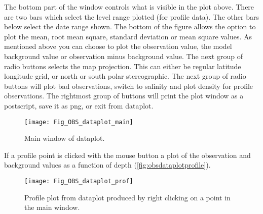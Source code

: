 \documentclass[../main/NEMO_manual]{subfiles}
\begin{document}
The bottom part of the window controls what is visible in the plot above.
There are two bars which select the level range plotted (for profile data).
The other bars below select the date range shown.
The bottom of the figure allows the option to plot the mean, root mean square, standard deviation or
mean square values.
As mentioned above you can choose to plot the observation value, the model background value or
observation minus background value.
The next group of radio buttons selects the map projection.
This can either be regular latitude longitude grid, or north or south polar stereographic.
The next group of radio buttons will plot bad observations, switch to salinity and
plot density for profile observations.
The rightmost group of buttons will print the plot window as a postscript, save it as png, or exit from dataplot.

\begin{figure}
  \begin{center}
    \texttt{[image: Fig\_OBS\_dataplot\_main]}
    \caption{
      \protect\label{fig:obsdataplotmain}
      Main window of dataplot.
    }
  \end{center}
\end{figure}

If a profile point is clicked with the mouse button a plot of the observation and background values as
a function of depth (\autoref{fig:obsdataplotprofile}).

\begin{figure}
  \begin{center}
    \texttt{[image: Fig\_OBS\_dataplot\_prof]}
    \caption{
      \protect\label{fig:obsdataplotprofile}
      Profile plot from dataplot produced by right clicking on a point in the main window.
    }
  \end{center}
\end{figure}

\biblio
\end{document}
